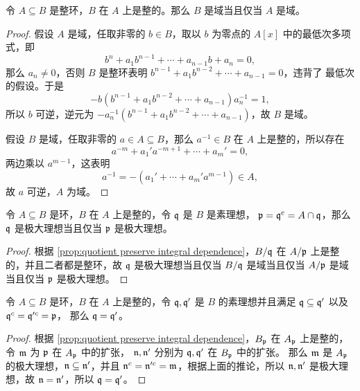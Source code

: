 \begin{proposition}
  令 $A\subseteq B$ 是整环，$B$ 在 $A$ 上是整的。那么 $B$ 是域当且仅当 $A$ 是域。
\end{proposition}
\begin{proof}
  假设 $A$ 是域，任取非零的 $b\in B$，取以 $b$ 为零点的 $A[x]$ 中的最低次多项式，即
  \[
    b^n+a_1b^{n-1}+\cdots+a_{n-1}b+a_n=0,  
  \]
  那么 $a_n\neq 0$，否则 $B$ 是整环表明 $b^{n-1}+a_1b^{n-2}+\cdots+a_{n-1}=0$，违背了
  最低次的假设。于是
  \[
    -b(b^{n-1}+a_1b^{n-2}+\cdots+a_{n-1})a_n^{-1}=1,
  \]
  所以 $b$ 可逆，逆元为 $-a_n^{-1}(b^{n-1}+a_1b^{n-2}+\cdots+a_{n-1})$，故 $B$ 是域。

  假设 $B$ 是域，任取非零的 $a\in A\subseteq B$，那么 $a^{-1}\in B$ 在 $A$ 上是整的，所以存在
  \[
    a^{-m}+a_1'a^{-m+1}+\cdots+a_m'=0,  
  \]
  两边乘以 $a^{m-1}$，这表明
  \[
     a^{-1}=-(a_1'+\cdots+a_m'a^{m-1})\in A,
  \]
  故 $a$ 可逆，$A$ 为域。
\end{proof}

\begin{corollary}\label{coro:maximal ideal of integral}
  令 $A\subseteq B$ 是环，$B$ 在 $A$ 上是整的，令 $\mathfrak{q}$ 是 $B$ 是素理想，
  $\mathfrak{p}=\mathfrak{q}^c=A\cap\mathfrak{q}$，那么 $\mathfrak{q}$ 是极大理想当且仅当
  $\mathfrak{p}$ 是极大理想。
\end{corollary}
\begin{proof}
  根据 \autoref{prop:quotient preserve integral dependence}，$B/\mathfrak{q}$ 
  在 $A/\mathfrak{p}$ 上是整的，并且二者都是整环，故 $\mathfrak{q}$ 是极大理想当且仅当
  $B/\mathfrak{q}$ 是域当且仅当 $A/\mathfrak{p}$ 是域当且仅当 $\mathfrak{p}$ 是极大理想。
\end{proof}

\begin{corollary}\label{coro:contraction of prime ideal}
  令 $A\subseteq B$ 是环，$B$ 在 $A$ 上是整的，令 $\mathfrak{q},\mathfrak{q}'$ 是 $B$
  的素理想并且满足 $\mathfrak{q}\subseteq\mathfrak{q}'$ 以及 $\mathfrak{q}^c=\mathfrak{q}'^c=\mathfrak{p}$，
  那么 $\mathfrak{q}=\mathfrak{q}'$。
\end{corollary}
\begin{proof}
  根据 \autoref{prop:quotient preserve integral dependence}，$B_{\mathfrak{p}}$
  在 $A_{\mathfrak{p}}$ 上是整的，令 $\mathfrak{m}$ 为 $\mathfrak{p}$ 在 $A_{\mathfrak{p}}$ 中的扩张，
  $\mathfrak{n},\mathfrak{n}'$ 分别为 $\mathfrak{q},\mathfrak{q}'$ 在 $B_{\mathfrak{p}}$ 中的扩张。
  那么 $\mathfrak{m}$ 是 $A_{\mathfrak{p}}$ 的极大理想，$\mathfrak{n}\subseteq\mathfrak{n}'$，并且
  $\mathfrak{n}^c=\mathfrak{n}'^c=\mathfrak{m}$，根据上面的推论，所以
  $\mathfrak{n},\mathfrak{n}'$ 是极大理想，故 $\mathfrak{n}=\mathfrak{n}'$，所以 $\mathfrak{q}=\mathfrak{q}'$。
\end{proof}

